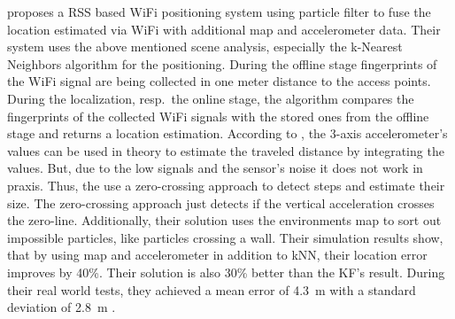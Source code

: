 \citet{wang:wlan} proposes a \acs{RSS} based WiFi positioning system using particle filter to fuse the location estimated via WiFi with additional map and accelerometer data. Their system uses the above mentioned scene analysis, especially the k-Nearest Neighbors algorithm for the positioning. During the offline stage fingerprints of the WiFi signal are being collected in one meter distance to the access points. During the localization, resp.\ the online stage, the algorithm compares the fingerprints of the collected WiFi signals with the stored ones from the offline stage and returns a location estimation. According to \citet{wang:wlan}, the 3-axis accelerometer's values can be used in theory to estimate the traveled distance by integrating the values. But, due to the low signals and the sensor's noise it does not work in praxis. Thus, the use a zero-crossing approach to detect steps and estimate their size. The zero-crossing approach just detects if the vertical acceleration crosses the zero-line. Additionally, their solution uses the environments map to sort out impossible particles, like particles crossing a wall.
Their simulation results show, that by using map and accelerometer in addition to kNN, their location error improves by 40\%. Their solution is also 30\% better than the \ac{KF}'s result. During their real world tests, they achieved a mean error of 4.3~m with a standard deviation of 2.8~m \citep{wang:wlan}.

